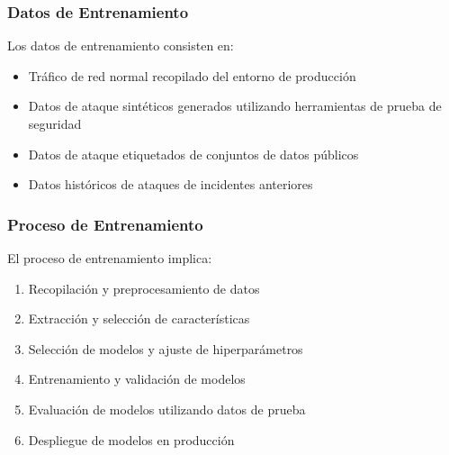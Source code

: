 \subsubsection{Datos de Entrenamiento}
Los datos de entrenamiento consisten en:

\begin{itemize}
    \item Tráfico de red normal recopilado del entorno de producción
    \item Datos de ataque sintéticos generados utilizando herramientas de prueba de seguridad
    \item Datos de ataque etiquetados de conjuntos de datos públicos
    \item Datos históricos de ataques de incidentes anteriores
\end{itemize}

\subsubsection{Proceso de Entrenamiento}
El proceso de entrenamiento implica:

\begin{enumerate}
    \item Recopilación y preprocesamiento de datos
    \item Extracción y selección de características
    \item Selección de modelos y ajuste de hiperparámetros
    \item Entrenamiento y validación de modelos
    \item Evaluación de modelos utilizando datos de prueba
    \item Despliegue de modelos en producción
\end{enumerate}

